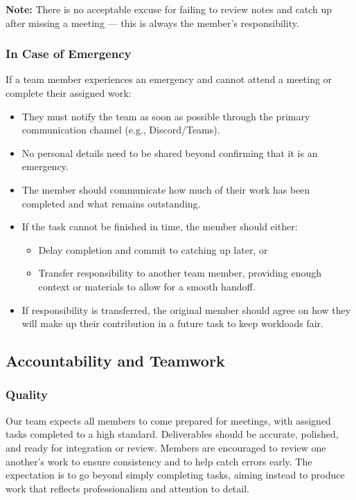 \documentclass{article}
\begin{document}
\textbf{Note:} There is no acceptable excuse for failing to review notes and catch up after missing a meeting — this is always the member’s responsibility.

\subsubsection*{In Case of Emergency}

If a team member experiences an emergency and cannot attend a meeting or complete their assigned work:
\begin{itemize}
    \item They must notify the team as soon as possible through the primary communication channel (e.g., Discord/Teams).
    \item No personal details need to be shared beyond confirming that it is an emergency.
    \item The member should communicate how much of their work has been completed and what remains outstanding.
    \item If the task cannot be finished in time, the member should either:
    \begin{itemize}
        \item Delay completion and commit to catching up later, or
        \item Transfer responsibility to another team member, providing enough context or materials to allow for a smooth handoff.
    \end{itemize}
    \item If responsibility is transferred, the original member should agree on how they will make up their contribution in a future task to keep workloads fair.
\end{itemize}


\subsection*{Accountability and Teamwork}

\subsubsection*{Quality}

Our team expects all members to come prepared for meetings, with assigned tasks completed to a high standard. Deliverables should be accurate, polished, and ready for integration or review. Members are encouraged to review one another’s work to ensure consistency and to help catch errors early. The expectation is to go beyond simply completing tasks, aiming instead to produce work that reflects professionalism and attention to detail.
\end{document}
